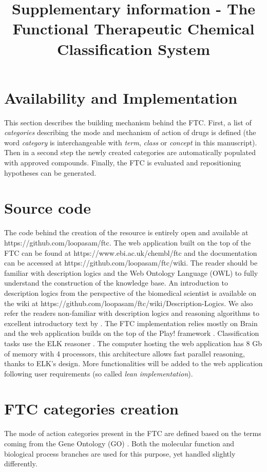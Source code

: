\documentclass{bioinfo}
\begin{document}

\title[Supplementary information - The Functional Therapeutic Chemical Classification System]{Supplementary information - 
The Functional Therapeutic Chemical Classification System}

\section*{Availability and Implementation}

This section describes the building mechanism behind the FTC.
First, a list of \emph{categories} describing the mode and mechanism of action of drugs is defined (the word \emph{category} is interchangeable with \emph{term}, \emph{class} or \emph{concept} in this manuscript). 
Then in a second step the newly created categories are automatically populated with approved compounds. 
Finally, the FTC is evaluated and repositioning hypotheses can be generated.

\section{Source code}
The code behind the creation of the resource is entirely open and available 
at {{https://github.com/loopasam/ftc}}. The web application built on the top of the 
FTC can be found at {{https://www.ebi.ac.uk/chembl/ftc}} and the documentation can be 
accessed at {{https://github.com/loopasam/ftc/wiki}}. The reader should be familiar with 
description logics and the Web Ontology Language (OWL) to fully understand the construction of the 
knowledge base. An introduction to description logics from the perspective of the biomedical scientist is 
available on the wiki at {{https://github.com/loopasam/ftc/wiki/Description-Logics}}. We also refer the readers non-familiar
with description logics and reasoning algorithms to excellent introductory text by \cite{krotzsch2012description}.
The FTC implementation 
relies mostly on Brain \citep{Croset2013} and the web application builds on the top of the Play! framework \citep{playframework}. 
Classification tasks use the ELK reasoner \citep{Kazakov2011}. The computer hosting the web application has 8 Gb of memory 
with 4 processors, this architecture allows fast parallel reasoning, thanks to ELK's design. More functionalities 
will be added to the web application following user requirements (so called \emph{lean implementation}).

\section{FTC categories creation}
The mode of action categories present in the FTC are defined based on the terms coming from the 
Gene Ontology (GO) \citep{Ashburner2000}. Both the molecular function and biological process branches are used for 
this purpose, yet handled slightly differently.
\end{document}
